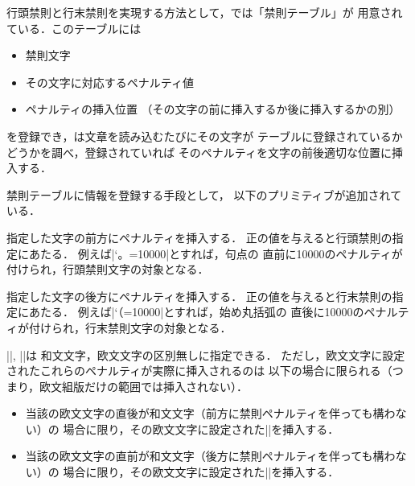 \documentclass[a4paper,11pt,nomag,dvipdfmx]{jsarticle}
\begin{document}
行頭禁則と行末禁則を実現する方法として，\pTeX では「禁則テーブル」が
用意されている．このテーブルには
\begin{itemize}
\item 禁則文字
\item その文字に対応するペナルティ値
\item ペナルティの挿入位置
      （その文字の前に挿入するか後に挿入するかの別）
\end{itemize}
を登録でき，\pTeX は文章を読み込むたびにその文字が
テーブルに登録されているかどうかを調べ，登録されていれば
そのペナルティを文字の前後適切な位置に挿入する．

禁則テーブルに情報を登録する手段として，
以下のプリミティブが追加されている．

\begin{cslist}
\csitem[\.{prebreakpenalty} <character code>=<number>]
  指定した文字の前方にペナルティを挿入する．
  正の値を与えると行頭禁則の指定にあたる．
  例えば|\prebreakpenalty`。=10000|とすれば，句点の
  直前に10000のペナルティが付けられ，行頭禁則文字の対象となる．

\csitem[\.{postbreakpenalty} <character code>=<number>]
  指定した文字の後方にペナルティを挿入する．
  正の値を与えると行末禁則の指定にあたる．
  例えば|\postbreakpenalty`（=10000|とすれば，始め丸括弧の
  直後に10000のペナルティが付けられ，行末禁則文字の対象となる．
\end{cslist}

|\prebreakpenalty|, |\postbreakpenalty|は
和文文字，欧文文字の区別無しに指定できる．
ただし，欧文文字に設定されたこれらのペナルティが実際に挿入されるのは
以下の場合に限られる（つまり，欧文組版だけの範囲では挿入されない）．
\begin{itemize}
  \item 当該の欧文文字の直後が和文文字（前方に禁則ペナルティを伴っても構わない）の
    場合に限り，その欧文文字に設定された|\postbreakpenalty|を挿入する．
  \item 当該の欧文文字の直前が和文文字（後方に禁則ペナルティを伴っても構わない）の
    場合に限り，その欧文文字に設定された|\prebreakpenalty|を挿入する．
\end{itemize}
\iffalse %
\begin{dangerous}
上記の「欧文文字に設定された禁則ペナルティが挿入される状況」は
欧文文字と和文文字の境界であり，
ベースライン補正（\ref{sec:baselineshift}節を参照）を実現する
|disp_node|の挿入箇所でもある．
ベースライン補正がゼロでないとき，|penalty_node|と|disp_node|の
挿入順序は以下のようにしている． %
\begin{itemize}
  \item 欧文→和文文字間： |disp_node| → |penalty_node| (\.{postbreakpenalty}) の順
  \item 和文→欧文文字間： |penalty_node| (\.{prebreakpenalty}) → |disp_node| の順
\end{itemize}
\end{dangerous}
\fi %
\end{document}
